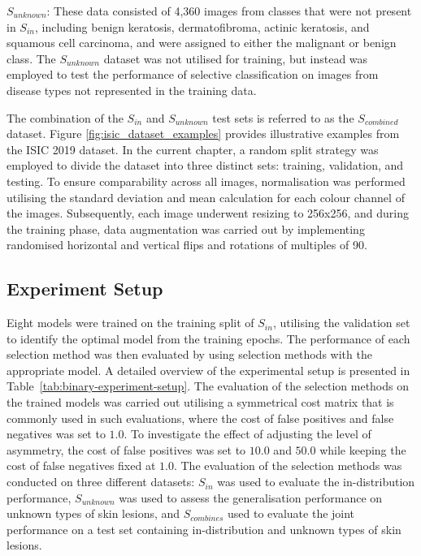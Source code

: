 $S_{unknown}$: These data consisted of 4,360 images from classes that were not present in $S_{in}$, including benign keratosis, dermatofibroma, actinic keratosis, and squamous cell carcinoma, and were assigned to either the malignant or benign class. The $S_{unknown}$ dataset was not utilised for training, but instead was employed to test the performance of selective classification on images from disease types not represented in the training data.

The combination of the $S_{in}$ and $S_{unknown}$ test sets is referred to as the $S_{combined}$ dataset. Figure \ref{fig:isic_dataset_examples} provides illustrative examples from the ISIC 2019 dataset. In the current chapter, a random split strategy was employed to divide the dataset into three distinct sets: training, validation, and testing. To ensure comparability across all images, normalisation was performed utilising the standard deviation and mean calculation for each colour channel of the images. Subsequently, each image underwent resizing to 256x256, and during the training phase, data augmentation was carried out by implementing randomised horizontal and vertical flips and rotations of multiples of 90\textdegree.

\subsection{Experiment Setup}
Eight models were trained on the training split of $S_{in}$, utilising the validation set to identify the optimal model from the training epochs. The performance of each selection method was then evaluated by using selection methods with the appropriate model. A detailed overview of the experimental setup is presented in Table~\ref{tab:binary-experiment-setup}. The evaluation of the selection methods on the trained models was carried out utilising a symmetrical cost matrix that is commonly used in such evaluations, where the cost of false positives and false negatives was set to $1.0$. To investigate the effect of adjusting the level of asymmetry, the cost of false positives was set to $10.0$ and $50.0$ while keeping the cost of false negatives fixed at $1.0$. The evaluation of the selection methods was conducted on three different datasets: $S_{in}$ was used to evaluate the in-distribution performance, $S_{unknown}$ was used to assess the generalisation performance on unknown types of skin lesions, and $S_{combines}$ used to evaluate the joint performance on a test set containing in-distribution and unknown types of skin lesions.

